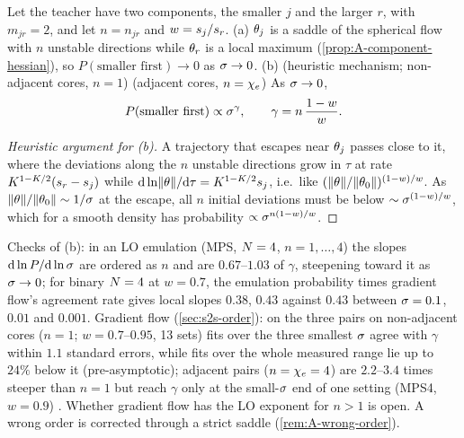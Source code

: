 \begin{proposition}\label{prop:A-matrix-like}
  Let the teacher have two components, the smaller $j$ and the larger $r$, with $m_{jr}=2$, and let
  $n=n_{jr}$ and $w=s_{j}/s_{r}$. (a) \derived{} \knownresult[binary $\Ns=4$, the limit $P\to0$:
  \citealp{jacot2022saddletosaddle}, Thm~2; their probability-one proof for depth three assumes a full-rank
  gradient at the origin] $\theta_j$ is a saddle of the spherical flow with $n$ unstable
  directions while $\theta_r$ is a local maximum (\cref{prop:A-component-hessian}), so
  $P(\text{smaller first})\to0$ as $\sigma\to0$. (b) \empirical{} (heuristic mechanism; non-adjacent cores,
  $n=1$) \conjecture{} (adjacent cores, $n=\chi_{e}$) \newresult{} As $\sigma\to0$,
  \begin{equation}\label{eq:A-matrix-like}
    P(\text{smaller first})\propto\sigma^{\gamma},\qquad\gamma=n\,\frac{1-w}{w}.
  \end{equation}
\end{proposition}
\begin{proof}[Heuristic argument for (b)]
  A trajectory that escapes near $\theta_j$ passes close to it, where the deviations along the $n$ unstable
  directions grow in $\tau$ at rate $K^{1-K/2}(s_{r}-s_{j})$ while $\mathrm{d}\ln\lVert\theta\rVert/\mathrm{d}\tau=K^{1-K/2}s_{j}$, i.e.\
  like $(\lVert\theta\rVert/\lVert\theta_0\rVert)^{(1-w)/w}$. As $\lVert\theta\rVert/\lVert\theta_0\rVert\sim1/\sigma$ at the escape, all $n$
  initial deviations must be below $\sim\sigma^{(1-w)/w}$, which for a smooth density has probability
  $\propto\sigma^{n(1-w)/w}$.
\end{proof}
Checks of (b): in an LO emulation (MPS, $\Ns=4$, $n=1,\dots,4$) the slopes $\mathrm{d}\ln P/\mathrm{d}\ln\sigma$ are ordered as $n$
and are $0.67$--$1.03$ of $\gamma$, steepening toward it as $\sigma\to0$; for binary $\Ns=4$ at $w=0.7$, the emulation
probability times gradient flow's agreement rate gives local slopes $0.38$, $0.43$ against $0.43$ between
$\sigma=0.1$, $0.01$ and $0.001$. Gradient flow (\cref{sec:s2s-order}): on the
three pairs on non-adjacent cores ($n=1$; $w=0.7$--$0.95$, 13 sets) fits over the three smallest $\sigma$ agree with
$\gamma$ within $1.1$ standard errors, while fits over the whole measured range lie up to $24\%$ below it
(pre-asymptotic); adjacent pairs ($n=\chi_{e}=4$) are $2.2$--$3.4$ times steeper than $n=1$ but reach $\gamma$ only at the
small-$\sigma$ end of one setting (MPS4, $w=0.9$) \empirical. Whether gradient flow has the LO exponent for $n>1$ is
open. A wrong order is corrected through a strict saddle (\cref{rem:A-wrong-order}).

